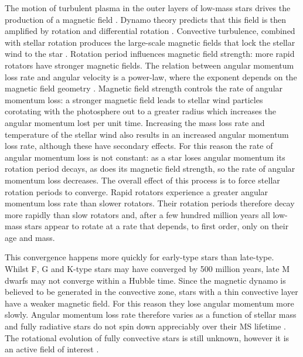 The motion of turbulent plasma in the outer layers of low-mass stars drives
the production of a magnetic field \citep[][]{Schatzman1962}.
Dynamo theory predicts that this field is then amplified by rotation and
differential rotation \citep[\eg][]{Parker1970}.
Convective turbulence, combined with stellar rotation produces the large-scale
magnetic fields that lock the stellar wind to the star
\citep[\eg][]{Charbonneau2010}.
Rotation period influences magnetic field strength: more rapid rotators have
stronger magnetic fields.
The relation between angular momentum loss rate and angular velocity is a
power-law, where the exponent depends on the magnetic field geometry
\citep{Mestel1984, Kawaler1988}.
Magnetic field strength controls the rate of angular momentum loss: a stronger
magnetic field leads to stellar wind particles corotating with the photosphere
out to a greater radius which increases the angular momentum lost per unit
time.
Increasing the mass loss rate and temperature of the stellar wind also results
in an increased angular momentum loss rate, although these have secondary
effects.
For this reason the rate of angular momentum loss is not constant: as a star
loses angular momentum its rotation period decays, as does its magnetic field
strength, so the rate of angular momentum loss decreases.
The overall effect of this process is to force stellar rotation periods to
converge.
Rapid rotators experience a greater angular momentum loss rate than slower
rotators.
Their rotation periods therefore decay more rapidly than slow rotators and,
after a few hundred million years all low-mass stars appear to rotate at a
rate that depends, to first order, only on their age and mass.

This convergence happens more quickly for early-type stars than late-type.
Whilst F, G and K-type stars may have converged by 500 million years,
\citep{Radick1987, Irwin2009} late M dwarfs may not converge within a Hubble
time.
Since the magnetic dynamo is believed to be generated in the convective zone,
stars with a thin convective layer have a weaker magnetic field.
For this reason they lose angular momentum more slowly.
Angular momentum loss rate therefore varies as a function of stellar mass and
fully radiative stars do not spin down appreciably over their MS lifetime
\citep{Noyes1984b}.
The rotational evolution of fully convective stars is still unknown, however
it is an active field of interest \citep[\eg][]{Mcquillan2013, Newton2015}.

